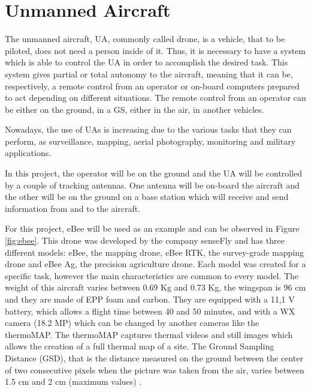 \section{Unmanned Aircraft}\label{sec:drone}

The unmanned aircraft, UA, commonly called drone, is a vehicle, that to be piloted, does not need a person inside of it. Thus, it is necessary to have a system which is able to control the UA in order to accomplish the desired task. This system gives partial or total autonomy to the aircraft, meaning that it can be, respectively, a remote control from an operator or on-board computers prepared to act depending on different situations. The remote control from an operator can be either on the ground, in a GS, either in the air, in another vehicles.

Nowadays, the use of UAs is increasing due to the various tasks that they can perform, as surveillance, mapping, aerial photography, monitoring and military applications.

In this project, the operator will be on the ground and the UA will be controlled by a couple of tracking antennas. One antenna will be on-board the aircraft and the other will be on the ground on a base station which will receive and send information from and to the aircraft. 

For this project, eBee will be used as an example and can be observed in Figure \ref{fig:ebee}. This drone was developed by the company senseFly and has three different models: eBee, the mapping drone, eBee RTK, the survey-grade mapping drone and eBee Ag, the precision agriculture drone. Each model was created for a specific task, however the main characteristics are common to every model. The weight of this aircraft varies between 0.69 Kg and 0.73 Kg, the wingspan is 96 cm and they are made of EPP foam and carbon. They are equipped with a 11,1 V battery, which allows a flight time between 40 and 50 minutes, and with a WX camera (18.2 MP) which can be changed by another cameras like the thermoMAP. The thermoMAP captures thermal videos and still images which allows the creation of a full thermal map of a site. The Ground Sampling Distance (GSD), that is the distance measured on the ground between the center of two consecutive pixels when the picture was taken from the air, varies between 1.5 cm and 2 cm (maximum values)  \cite{eBee}. 
 
